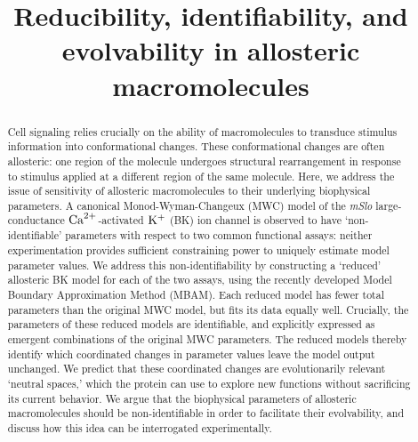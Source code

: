 \documentclass{article}
\newcommand\ca{\rm{Ca}^{2+}}
\newcommand\kk{\rm{K}^+}
\begin{document}
\title{Reducibility, identifiability, and evolvability in allosteric macromolecules}

\maketitle

\begin{abstract}
Cell signaling relies crucially on the ability of macromolecules to transduce stimulus information into conformational changes.
These conformational changes are often allosteric: one region of the molecule undergoes structural rearrangement in response to stimulus applied at a different region of the same molecule.  Here, we address the issue of sensitivity of allosteric macromolecules to their underlying biophysical parameters.  
%
%
A canonical Monod-Wyman-Changeux (MWC) model of  the {\it mSlo} large-conductance $\ca$-activated $\kk$ (BK) ion channel is observed to have `non-identifiable' parameters with respect to two common functional assays: neither experimentation provides sufficient constraining power to uniquely estimate model parameter values.  
%
%
We address this non-identifiability by constructing a `reduced' allosteric BK model for each of the two assays, using the recently developed Model Boundary Approximation Method (MBAM).  Each reduced model has fewer total parameters than the original MWC model, but fits its data equally well.  Crucially, the parameters of these reduced models are identifiable, and explicitly expressed as emergent combinations of the original MWC parameters.
%
The reduced models thereby identify which coordinated changes in parameter values leave the model output unchanged.  We predict that these coordinated changes are evolutionarily relevant `neutral spaces,' which the protein can use to explore new functions without sacrificing its current behavior.  We argue that the biophysical parameters of allosteric macromolecules should be non-identifiable in order to facilitate their evolvability, and discuss how this idea can be interrogated experimentally.
%
%






\end{abstract}
\end{document}
